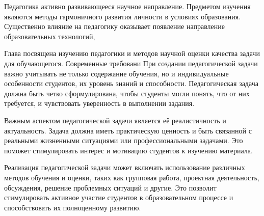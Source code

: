 Педагогика активно развивающееся научное направление. 
Предметом изучения являются методы гармоничного развития личности в условиях образования. 
Существенно влияние на педагогику оказывает появление направление образовательных технологий,

Глава посвящена изучению педагогики и методов научной оценки качества задачи для обучающегося. Современные требовани
При создании педагогической задачи важно учитывать не только содержание обучения, но и индивидуальные особенности студентов, их уровень знаний и способности. Педагогическая задача должна быть четко сформулирована, чтобы студенты могли понять, что от них требуется, и чувствовать уверенность в выполнении задания.

Важным аспектом педагогической задачи является её реалистичность и актуальность. Задача должна иметь практическую ценность и быть связанной с реальными жизненными ситуациями или профессиональными задачами. Это поможет стимулировать интерес и мотивацию студентов к изучению материала.



Реализация педагогической задачи может включать использование различных методов обучения и оценки, таких как групповая работа, проектная деятельность, обсуждения, решение проблемных ситуаций и другие. Это позволит стимулировать активное участие студентов в образовательном процессе и способствовать их полноценному развитию.

 